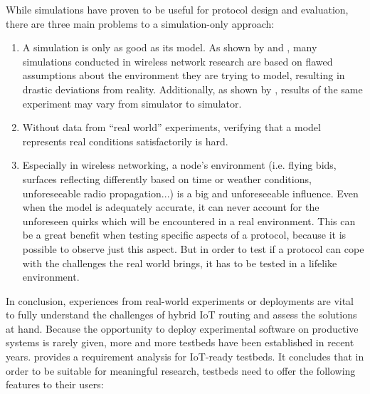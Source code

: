 \documentclass[a4paper,10pt]{scrartcl}
\begin{document}
While simulations have proven to be useful for protocol design and evaluation, there are three main problems to a simulation-only approach: %
\begin{enumerate}
\item A simulation is only as good as its model. As shown by \cite{mistaken-axioms} and \cite{exp_eval_wsn_assumptions}, many simulations conducted in wireless network research are based on flawed assumptions about the environment they are trying to model, resulting in drastic deviations from reality. Additionally, as shown by \cite{sim_accuracy}, results of the same experiment may vary from simulator to simulator.
\item Without data from ``real world'' experiments, verifying that a model represents real conditions satisfactorily is hard.
\item Especially in wireless networking, a node's environment (i.e. flying bids, surfaces reflecting differently based on time or weather conditions, unforeseeable radio propagation...) is a big and unforeseeable influence. Even when the model is adequately accurate, it can never account for the unforeseen quirks which will be encountered in a real environment. This can be a great benefit when testing specific aspects of a protocol, because it is possible to observe just this aspect. But in order to test if a protocol can cope with the challenges the real world brings, it has to be tested in a lifelike environment.
\end{enumerate}
In conclusion, experiences from real-world experiments or deployments are vital to fully understand the challenges of hybrid IoT routing and assess the solutions at hand. Because the opportunity to deploy experimental software on productive systems is rarely given, more and more testbeds have been established in recent years. \cite{testbed-survey} provides a requirement analysis for IoT-ready testbeds. It concludes that in order to be suitable for meaningful research, testbeds need to offer the following features to their users:
\end{document}
